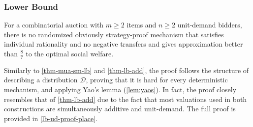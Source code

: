 







\subsubsection{Lower Bound}
\begin{theorem}\label{thm-lb-ud}
For a combinatorial auction with $m\ge 2$ items and $n\ge 2$ unit-demand bidders, there 
is no randomized obviously strategy-proof mechanism that satisfies individual rationality and no negative transfers and gives approximation better than $\frac{8}{7}$ to the optimal social welfare.
\end{theorem}
Similarly to \cref{thm-mua-sm-lb} and \cref{thm-lb-add}, the proof follows the structure of describing a distribution $\mathcal{D}$, proving that it is hard for every deterministic mechanism, and applying Yao's lemma (\cref{lem:yaos}). In fact, the proof closely resembles that of \cref{thm-lb-add} due to the fact that most valuations used in both constructions are simultaneously additive and unit-demand. The full proof is provided in \cref{lb-ud-proof-place}.




